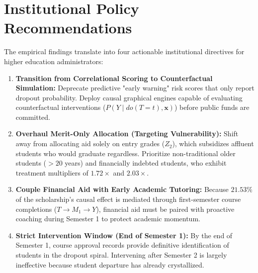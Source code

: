 \section{Institutional Policy Recommendations}
\label{sec:concl_recommendations}

The empirical findings translate into four actionable institutional directives for higher education administrators:

\begin{enumerate}
    \item \textbf{Transition from Correlational Scoring to Counterfactual Simulation:} Deprecate predictive "early warning" risk scores that only report dropout probability. Deploy causal graphical engines capable of evaluating counterfactual interventions ($P(Y \mid do(T=t), \mathbf{x})$) before public funds are committed.
    \item \textbf{Overhaul Merit-Only Allocation (Targeting Vulnerability):} Shift away from allocating aid solely on entry grades ($Z_2$), which subsidizes affluent students who would graduate regardless. Prioritize non-traditional older students ($>20$ years) and financially indebted students, who exhibit treatment multipliers of $1.72\times$ and $2.03\times$.
    \item \textbf{Couple Financial Aid with Early Academic Tutoring:} Because $21.53\%$ of the scholarship's causal effect is mediated through first-semester course completions ($T \to M_1 \to Y$), financial aid must be paired with proactive coaching during Semester 1 to protect academic momentum.
    \item \textbf{Strict Intervention Window (End of Semester 1):} By the end of Semester 1, course approval records provide definitive identification of students in the dropout spiral. Intervening after Semester 2 is largely ineffective because student departure has already crystallized.
\end{enumerate}
